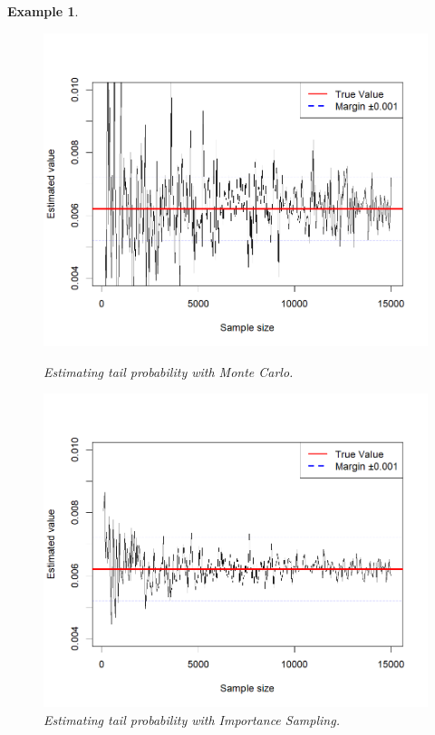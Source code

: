 \documentclass{article}\usepackage[]{graphicx}\usepackage[]{xcolor}
\newtheorem{example}{Example}
\begin{document}
\begin{example}
\begin{figure}[h!]
    \centering
    \begin{minipage}{0.8\textwidth}
        \centering
        \includegraphics[width=\textwidth]{Figures/Estimating tail probability with direct Monte Carlo experiment.png}
        \caption{Estimating tail probability with Monte Carlo.}
    \end{minipage}
    \hspace{1cm} %
    \begin{minipage}{0.8\textwidth}
        \centering
        \includegraphics[width=\textwidth]{Figures/Estimating tail probability with Importance sampling.png}
        \caption{Estimating tail probability with Importance Sampling.}
    \end{minipage}
    \label{MC est of tail vs IS}
\end{figure}

\end{example}
\end{document}
